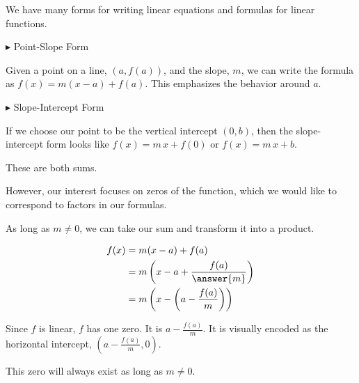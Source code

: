 \documentclass{ximera}
\begin{document}
We have many forms for writing linear equations and formulas for linear functions.



$\blacktriangleright$ Point-Slope Form

Given a point on a line, $(a, f(a))$, and the slope, $m$, we can write the formula as $f(x) = m(x-a) + f(a)$. This emphasizes the behavior around $a$.



$\blacktriangleright$ Slope-Intercept Form

If we choose our point to be the vertical intercept $(0, b)$, then the slope-intercept form looks like $f(x) = m \, x + f(0)$ or $f(x) = m \, x + b$.



These are both sums.


However, our interest focuses on zeros of the function, which we would like to correspond to factors in our formulas.  




\begin{model}



As long as $m \ne 0$, we can take our sum and transform it into a product.




\begin{align*}
f(x) & = m(x-a) + f(a) \\
& = m \left(x - a + \frac{f(a)}{\answer{m}}\right)  \\
& = m \left(x - \left(a - \frac{f(a)}{m}\right)\right) 
\end{align*}



Since $f$ is linear, $f$ has one zero.  It is $a - \frac{f(a)}{m}$.  It is visually encoded as the horizontal intercept, $\left(a - \frac{f(a)}{m}, 0\right)$.


This zero will always exist as long as $m \ne 0$.


\end{model}
\end{document}
